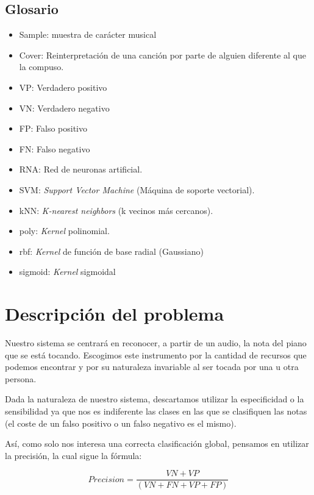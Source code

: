 \documentclass[12pt]{article}
\begin{document}
\subsection{Glosario}
\label{Glosario}
\begin{itemize}
	\item Sample: muestra de carácter musical
	\item Cover: Reinterpretación de una canción por parte de alguien diferente al que la compuso.
	\item VP: Verdadero positivo
	\item VN: Verdadero negativo
	\item FP: Falso positivo
	\item FN: Falso negativo
	\item RNA: Red de neuronas artificial.
	\item SVM: \textit{Support Vector Machine} (Máquina de soporte vectorial).
	\item kNN: \textit{K-nearest neighbors} (k vecinos más cercanos).
	\item poly: \textit{Kernel} polinomial.
	\item rbf: \textit{Kernel} de función de base radial (Gaussiano)
	\item sigmoid: \textit{Kernel} sigmoidal
\end{itemize}

\newpage

\section{Descripción del problema}
\label{Descripción del problema}

Nuestro sistema se centrará en reconocer, a partir de un audio, la nota del piano que se está tocando. Escogimos este instrumento por la cantidad de recursos
que podemos encontrar y por su naturaleza invariable al ser tocada por una u otra persona.

\bigskip
Dada la naturaleza de nuestro sistema, descartamos utilizar la especificidad o la sensibilidad ya que nos es indiferente las clases en las que se clasifiquen
las notas (el coste de un falso positivo o un falso negativo es el mismo).

\bigskip
Así, como solo nos interesa una correcta clasificación global, pensamos en utilizar la precisión, la cual sigue la fórmula:

\begin{equation}
	Precision = \frac{VN + VP}{(VN + FN + VP + FP)}
\end{equation}
\end{document}
